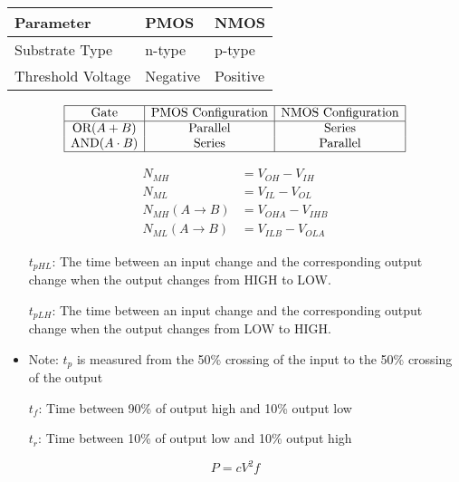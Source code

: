 \documentclass[8pt]{article}
\begin{document}
\begin{table}[h]
  \centering
  \begin{tabular}{|l|l|l|}
    \hline
    \textbf{Parameter} & \textbf{PMOS} & \textbf{NMOS} \\
    \hline
    Substrate Type     & n-type        & p-type        \\
    Threshold Voltage  & Negative      & Positive      \\
    \hline
  \end{tabular}
\end{table}

\[
  \begin{array}{|c|c|c|}
    \hline
    \text{Gate}            & \text{PMOS Configuration} & \text{NMOS Configuration} \\
    \hline
    \text{OR} (A + B)      & \text{Parallel}           & \text{Series}             \\
    \text{AND} (A \cdot B) & \text{Series}             & \text{Parallel}           \\
    \hline
  \end{array}
\]


\begin{align*}
  N_{MH}                  & = V_{OH} - V_{IH}   \\
  N_{ML}                  & = V_{IL} - V_{OL}   \\
  N_{MH}(A \rightarrow B) & = V_{OHA} - V_{IHB} \\
  N_{ML}(A \rightarrow B) & = V_{ILB} - V_{OLA}
\end{align*}

\begin{itemize}
  \item[$t_{pHL}$:] The time between an input change and the corresponding output change
        when the output changes from HIGH to LOW.
  \item[$t_{pLH}$:] The time between an input change and the corresponding output change
        when the output changes from LOW to HIGH.
  \item Note: $t_p$ is measured from the 50\% crossing
        of the input to the 50\% crossing of the output
  \item[$t_f$:] Time between 90\% of output high and 10\% output low
  \item[$t_r$:] Time between 10\% of output low and 10\% output high
\end{itemize}

\[  P = cV^2 f \]
\end{document}

